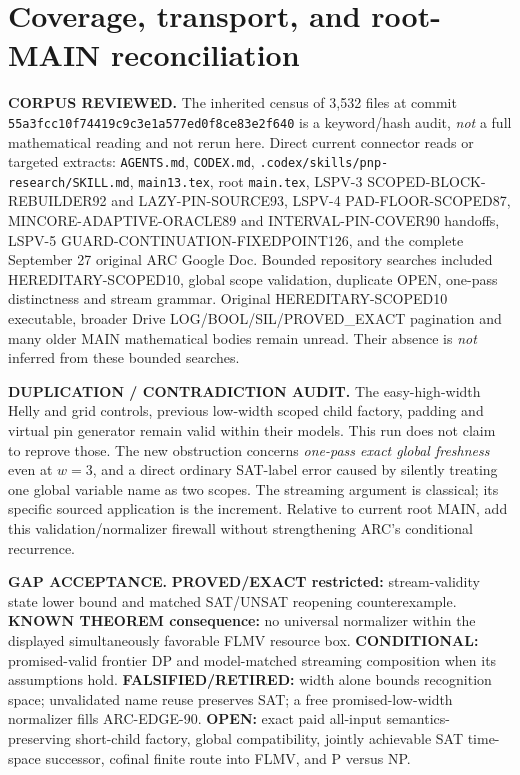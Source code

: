 \documentclass[11pt]{article}
\begin{document}
\section{Coverage, transport, and root-MAIN reconciliation}
\textbf{CORPUS REVIEWED.} The inherited census of 3,532 files at
commit \texttt{55a3fcc10f74419c9c3e1a577ed0f8ce83e2f640} is
a keyword/hash audit, \emph{not} a full mathematical reading and
not rerun here. Direct current connector reads or targeted extracts:
\texttt{AGENTS.md}, \texttt{CODEX.md},
\texttt{.codex/skills/pnp-research/SKILL.md}, \texttt{main13.tex},
root \texttt{main.tex}, LSPV-3 SCOPED-BLOCK-REBUILDER92 and
LAZY-PIN-SOURCE93, LSPV-4 PAD-FLOOR-SCOPED87,
MINCORE-ADAPTIVE-ORACLE89 and INTERVAL-PIN-COVER90 handoffs,
LSPV-5 GUARD-CONTINUATION-FIXEDPOINT126, and the complete
September 27 original ARC Google Doc.
Bounded repository searches included HEREDITARY-SCOPED10,
global scope validation, duplicate OPEN, one-pass distinctness
and stream grammar. Original HEREDITARY-SCOPED10 executable,
broader Drive LOG/BOOL/SIL/PROVED_EXACT pagination and many
older MAIN mathematical bodies remain unread. Their absence is
\emph{not} inferred from these bounded searches.

\textbf{DUPLICATION / CONTRADICTION AUDIT.} The easy-high-width
Helly and grid controls, previous low-width scoped child factory,
padding and virtual pin generator remain valid within their models.
This run does not claim to reprove those. The new obstruction
concerns \emph{one-pass exact global freshness} even at $w=3$,
and a direct ordinary SAT-label error caused by silently treating
one global variable name as two scopes. The streaming argument
is classical; its specific sourced application is the increment.
Relative to current root MAIN, add this validation/normalizer
firewall without strengthening ARC's conditional recurrence.

\textbf{GAP ACCEPTANCE.} \textbf{PROVED/EXACT restricted:}
stream-validity state lower bound and matched SAT/UNSAT reopening
counterexample. \textbf{KNOWN THEOREM consequence:} no universal
normalizer within the displayed simultaneously favorable FLMV
resource box. \textbf{CONDITIONAL:} promised-valid frontier DP
and model-matched streaming composition when its assumptions hold.
\textbf{FALSIFIED/RETIRED:} width alone bounds recognition space;
unvalidated name reuse preserves SAT; a free promised-low-width
normalizer fills ARC-EDGE-90.
\textbf{OPEN:} exact paid all-input semantics-preserving
short-child factory, global compatibility, jointly achievable
SAT time-space successor, cofinal finite route into FLMV, and
P versus NP.
\end{document}
